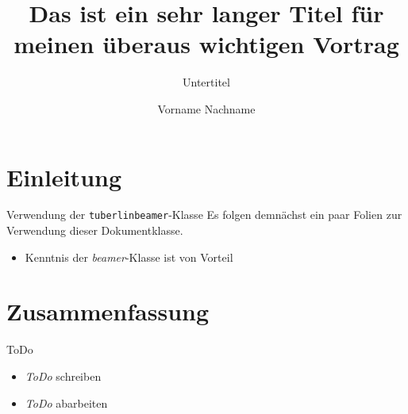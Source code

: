 \documentclass[Nike]{tuberlinbeamer}
\title{Das ist ein sehr langer Titel für meinen überaus wichtigen Vortrag}
\subtitle{Untertitel}
\author{Vorname Nachname}
\institute{Technische Universität Berlin}
\newcommand{\tubcls}{\texttt{tuberlinbeamer}\xspace}
\begin{document}
\begin{frame}
\maketitle
\end{frame}

\begin{frame}
\tableofcontents
\end{frame}


\section{Einleitung}

\begin{frame}[fragile]{Verwendung der \tubcls-Klasse}
Es folgen demnächst ein paar Folien zur Verwendung dieser Dokumentklasse.
\begin{itemize}
\item Kenntnis der \emph{beamer}-Klasse ist von Vorteil
\end{itemize}
\end{frame}


\section{Zusammenfassung}

\begin{frame}{ToDo}
\begin{itemize}[<+->]
\item \emph{ToDo} schreiben
\item \emph{ToDo} abarbeiten
\end{itemize}
\end{frame}
\end{document}
